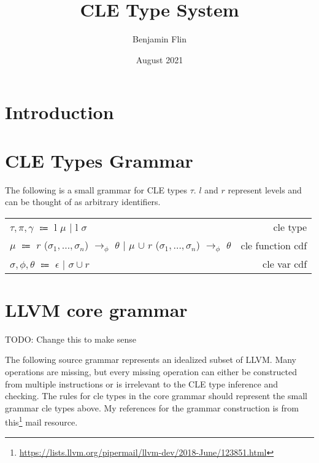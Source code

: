 \documentclass{article}
\title{CLE Type System}
\author{Benjamin Flin}
\date{August 2021}
\begin{document}
\maketitle

\section{Introduction}
\section{CLE Types Grammar}
The following is a small grammar for CLE types $\tau$. 
$l$ and $r$ represent levels and can be thought of as arbitrary identifiers.

\begin{center}
\begin{tabular}{ l r }
    $\tau, \pi, \gamma$ $\Coloneqq$ l $\mu$ $\mid$ l $\sigma$
    & cle type \\ 
    $\mu$ $\Coloneqq$ $r$ ($\sigma_1, \dots, \sigma_n$) $\rightarrow_\phi$ $\theta$ $\mid$ $\mu$ $\cup$ $r$ ($\sigma_1, \dots, \sigma_n$) $\rightarrow_\phi$ $\theta$    
    & cle function cdf \\
    $\sigma, \phi, \theta$ $\Coloneqq$ $\epsilon$ $\mid$ $\sigma \cup r$ 
    & cle var cdf \\
\end{tabular}
\end{center}

\section{LLVM core grammar}

TODO: Change this to make sense

The following source grammar represents an idealized subset of LLVM. 
Many operations are missing, but every missing operation can either be constructed from multiple instructions or is irrelevant to the CLE type inference and checking. 
The rules for cle types in the core grammar should represent the small grammar cle types above.
My references for the grammar construction is from this\footnote{\url{https://lists.llvm.org/pipermail/llvm-dev/2018-June/123851.html}} mail resource.
\end{document}

